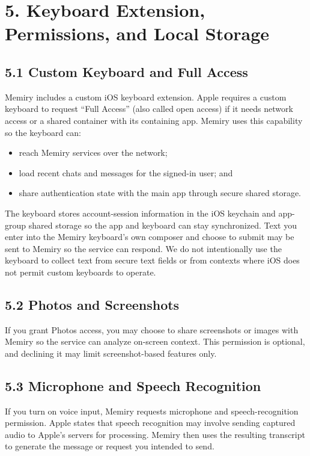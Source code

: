 \documentclass[11pt]{article}
\begin{document}
\section*{5. Keyboard Extension, Permissions, and Local Storage}

\subsection*{5.1 Custom Keyboard and Full Access}

Memiry includes a custom iOS keyboard extension. Apple requires a custom keyboard to request ``Full Access'' (also called open access) if it needs network access or a shared container with its containing app. Memiry uses this capability so the keyboard can:

\begin{itemize}
  \item reach Memiry services over the network;
  \item load recent chats and messages for the signed-in user; and
  \item share authentication state with the main app through secure shared storage.
\end{itemize}

The keyboard stores account-session information in the iOS keychain and app-group shared storage so the app and keyboard can stay synchronized. Text you enter into the Memiry keyboard's own composer and choose to submit may be sent to Memiry so the service can respond. We do not intentionally use the keyboard to collect text from secure text fields or from contexts where iOS does not permit custom keyboards to operate.

\subsection*{5.2 Photos and Screenshots}

If you grant Photos access, you may choose to share screenshots or images with Memiry so the service can analyze on-screen context. This permission is optional, and declining it may limit screenshot-based features only.

\subsection*{5.3 Microphone and Speech Recognition}

If you turn on voice input, Memiry requests microphone and speech-recognition permission. Apple states that speech recognition may involve sending captured audio to Apple's servers for processing. Memiry then uses the resulting transcript to generate the message or request you intended to send.
\end{document}
